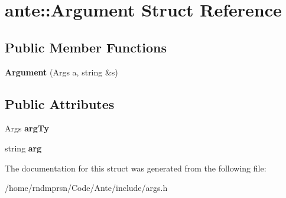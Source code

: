 \hypertarget{structante_1_1Argument}{}\section{ante\+:\+:Argument Struct Reference}
\label{structante_1_1Argument}
\subsection*{Public Member Functions}
\begin{DoxyCompactItemize}
\item 
\mbox{\label{structante_1_1Argument_aa4858a862bebee74b0fba57ce2e7afe4}} 
{\bfseries Argument} (Args a, string \&s)
\end{DoxyCompactItemize}
\subsection*{Public Attributes}
\begin{DoxyCompactItemize}
\item 
\mbox{\label{structante_1_1Argument_aeae83c8bc5cfec26d1fbae7d87084451}} 
Args {\bfseries arg\+Ty}
\item 
\mbox{\label{structante_1_1Argument_a389f04ab56fb2410978f9ebff1195cef}} 
string {\bfseries arg}
\end{DoxyCompactItemize}


The documentation for this struct was generated from the following file\+:\begin{DoxyCompactItemize}
\item 
/home/rndmprsn/\+Code/\+Ante/include/args.\+h\end{DoxyCompactItemize}
